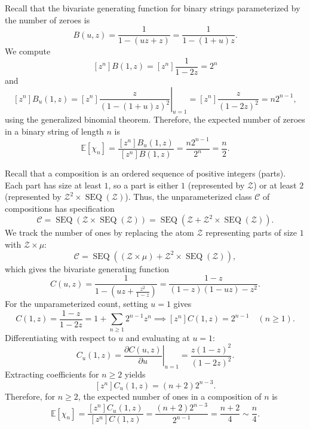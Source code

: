 
\begin{example}
    Recall that the bivariate generating function for binary strings parameterized by the number of zeroes is
    \[
        B(u, z) = \frac{1}{1 - (uz + z)} = \frac{1}{1 - (1+u)z}.
    \]
    We compute
    \[
        [z^n] B(1, z) = [z^n] \frac{1}{1 - 2z} = 2^n
    \]
    and
    \[
        [z^n] B_u(1, z) = [z^n] \left. \frac{z}{(1 - (1+u)z)^2} \right|_{u=1} = [z^n] \frac{z}{(1 - 2z)^2} = n 2^{n-1},
    \]
    using the generalized binomial theorem.
    Therefore, the expected number of zeroes in a binary string of length \(n\) is
    \[
        \mathbb{E}[\chi_n] = \frac{[z^n] B_u(1, z)}{[z^n] B(1, z)} = \frac{n 2^{n-1}}{2^n} = \frac{n}{2}.
    \]
\end{example}

\begin{example}
    Recall that a composition is an ordered sequence of positive integers (parts).
    Each part has size at least \(1\), so a part is either \(1\) (represented by \(\mathcal{Z}\)) or at least \(2\) (represented by \(\mathcal{Z}^2 \times \operatorname{SEQ}(\mathcal{Z})\)).
    Thus, the unparameterized class \(\mathcal{C}\) of compositions has specification
    \[
        \mathcal{C} = \operatorname{SEQ}(\mathcal{Z} \times \operatorname{SEQ}(\mathcal{Z})) = \operatorname{SEQ}(\mathcal{Z} + \mathcal{Z}^2 \times \operatorname{SEQ}(\mathcal{Z})).
    \]
    We track the number of ones by replacing the atom \(\mathcal{Z}\) representing parts of size \(1\) with \(\mathcal{Z} \times \mu\):
    \[
        \mathcal{C} = \operatorname{SEQ}((\mathcal{Z} \times \mu) + \mathcal{Z}^2 \times \operatorname{SEQ}(\mathcal{Z})),
    \]
    which gives the bivariate generating function
    \[
        C(u, z) = \frac{1}{1 - \left(uz + \frac{z^2}{1-z}\right)} = \frac{1-z}{(1-z)(1-uz) - z^2}.
    \]
    For the unparameterized count, setting \(u=1\) gives
    \[
        C(1, z) = \frac{1-z}{1-2z} = 1 + \sum_{n \ge 1} 2^{n-1} z^n \implies [z^n] C(1, z) = 2^{n-1} \quad (n \ge 1).
    \]
    Differentiating with respect to \(u\) and evaluating at \(u=1\):
    \[
        C_u(1, z) = \left. \frac{\partial C(u, z)}{\partial u} \right|_{u=1} = \frac{z(1-z)^2}{(1-2z)^2}.
    \]
    Extracting coefficients for \(n \ge 2\) yields
    \[
        [z^n] C_u(1, z) = (n+2) 2^{n-3}.
    \]
    Therefore, for \(n \ge 2\), the expected number of ones in a composition of \(n\) is
    \[
        \mathbb{E}[\chi_n] = \frac{[z^n] C_u(1, z)}{[z^n] C(1, z)} = \frac{(n+2)2^{n-3}}{2^{n-1}} = \frac{n+2}{4} \sim \frac{n}{4}.
    \]
\end{example}


